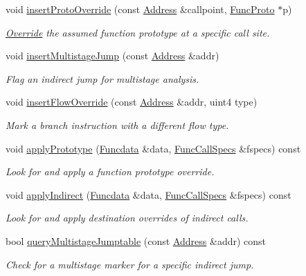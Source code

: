 \begin{DoxyCompactItemize}
void \mbox{\hyperlink{class_override_abf08af570f603eaf60f36f61c3a275ae}{insert\+Proto\+Override}} (const \mbox{\hyperlink{class_address}{Address}} \&callpoint, \mbox{\hyperlink{class_func_proto}{Func\+Proto}} $\ast$p)
\begin{DoxyCompactList}\small\item\em \mbox{\hyperlink{class_override}{Override}} the assumed function prototype at a specific call site. \end{DoxyCompactList}\item 
void \mbox{\hyperlink{class_override_a0922bffef45d1f3916dd63b12ace98ec}{insert\+Multistage\+Jump}} (const \mbox{\hyperlink{class_address}{Address}} \&addr)
\begin{DoxyCompactList}\small\item\em Flag an indirect jump for multistage analysis. \end{DoxyCompactList}\item 
void \mbox{\hyperlink{class_override_a840df7b308ba3fd78e1b16b23780f2bc}{insert\+Flow\+Override}} (const \mbox{\hyperlink{class_address}{Address}} \&addr, uint4 type)
\begin{DoxyCompactList}\small\item\em Mark a branch instruction with a different flow type. \end{DoxyCompactList}\item 
void \mbox{\hyperlink{class_override_a33eb920b5801c9c7cbd2334b16478ece}{apply\+Prototype}} (\mbox{\hyperlink{class_funcdata}{Funcdata}} \&data, \mbox{\hyperlink{class_func_call_specs}{Func\+Call\+Specs}} \&fspecs) const
\begin{DoxyCompactList}\small\item\em Look for and apply a function prototype override. \end{DoxyCompactList}\item 
void \mbox{\hyperlink{class_override_aa3bc812ae7fb2d03f14d2d67adbb6ede}{apply\+Indirect}} (\mbox{\hyperlink{class_funcdata}{Funcdata}} \&data, \mbox{\hyperlink{class_func_call_specs}{Func\+Call\+Specs}} \&fspecs) const
\begin{DoxyCompactList}\small\item\em Look for and apply destination overrides of indirect calls. \end{DoxyCompactList}\item 
bool \mbox{\hyperlink{class_override_a49748ed2ed69fc5be1baf9921d8f7028}{query\+Multistage\+Jumptable}} (const \mbox{\hyperlink{class_address}{Address}} \&addr) const
\begin{DoxyCompactList}\small\item\em Check for a multistage marker for a specific indirect jump. \end{DoxyCompactList}\item 

\end{DoxyCompactItemize}
